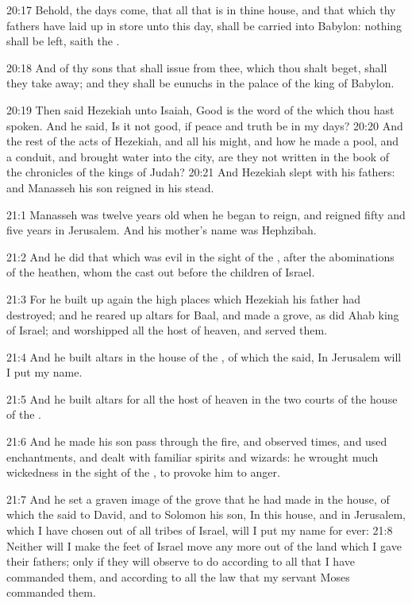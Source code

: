 20:17 Behold, the days come, that all that is in thine house, and that
which thy fathers have laid up in store unto this day, shall be
carried into Babylon: nothing shall be left, saith the \LORD.

20:18 And of thy sons that shall issue from thee, which thou shalt
beget, shall they take away; and they shall be eunuchs in the palace
of the king of Babylon.

20:19 Then said Hezekiah unto Isaiah, Good is the word of the \LORD
which thou hast spoken. And he said, Is it not good, if peace and
truth be in my days?  20:20 And the rest of the acts of Hezekiah, and
all his might, and how he made a pool, and a conduit, and brought
water into the city, are they not written in the book of the
chronicles of the kings of Judah?  20:21 And Hezekiah slept with his
fathers: and Manasseh his son reigned in his stead.

21:1 Manasseh was twelve years old when he began to reign, and reigned
fifty and five years in Jerusalem. And his mother's name was
Hephzibah.

21:2 And he did that which was evil in the sight of the \LORD, after
the abominations of the heathen, whom the \LORD cast out before the
children of Israel.

21:3 For he built up again the high places which Hezekiah his father
had destroyed; and he reared up altars for Baal, and made a grove, as
did Ahab king of Israel; and worshipped all the host of heaven, and
served them.

21:4 And he built altars in the house of the \LORD, of which the \LORD
said, In Jerusalem will I put my name.

21:5 And he built altars for all the host of heaven in the two courts
of the house of the \LORD.

21:6 And he made his son pass through the fire, and observed times,
and used enchantments, and dealt with familiar spirits and wizards: he
wrought much wickedness in the sight of the \LORD, to provoke him to
anger.

21:7 And he set a graven image of the grove that he had made in the
house, of which the \LORD said to David, and to Solomon his son, In
this house, and in Jerusalem, which I have chosen out of all tribes of
Israel, will I put my name for ever: 21:8 Neither will I make the feet
of Israel move any more out of the land which I gave their fathers;
only if they will observe to do according to all that I have commanded
them, and according to all the law that my servant Moses commanded
them.

